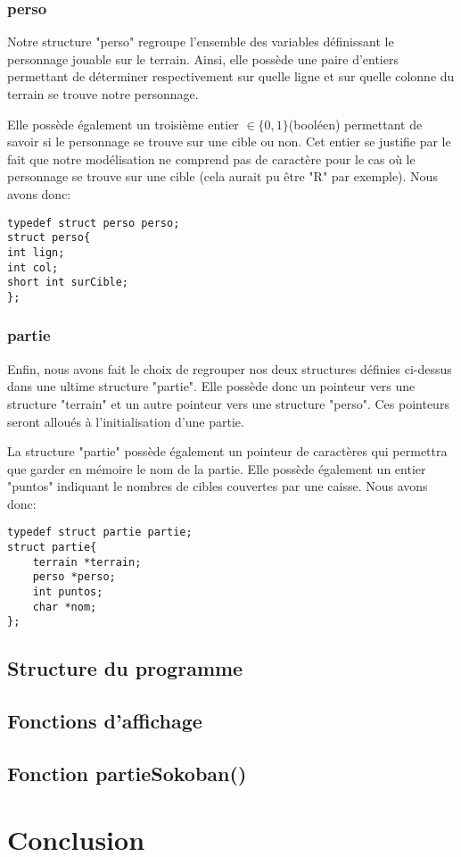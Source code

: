\documentclass[10pt,a4paper,french,titlepage]{article}
\begin{document}
\subsubsection{perso}
Notre structure "perso" regroupe l'ensemble des variables définissant le personnage jouable sur le terrain. Ainsi, elle possède une paire d'entiers permettant de déterminer respectivement sur quelle ligne et sur quelle colonne du terrain se trouve notre personnage. 

Elle possède également un troisième entier $\in \{0,1\}$(booléen) permettant de savoir si le personnage se trouve sur une cible ou non. Cet entier se justifie par le fait que notre modélisation ne comprend pas de caractère pour le cas où le personnage se trouve sur une cible (cela aurait pu être "R" par exemple). Nous avons donc:
\begin{lstlisting}
typedef struct perso perso;
struct perso{
int lign;
int col;
short int surCible;
};
\end{lstlisting}
\subsubsection{partie}
Enfin, nous avons fait le choix de regrouper nos deux structures définies ci-dessus dans une ultime structure "partie". Elle possède donc un pointeur vers une structure "terrain" et un autre pointeur vers une structure "perso". Ces pointeurs seront alloués à l'initialisation d'une partie.

La structure "partie" possède également un pointeur de caractères qui permettra que garder en mémoire le nom de la partie. Elle possède également un entier "puntos" indiquant le nombres de cibles couvertes par une caisse. Nous avons donc:
\begin{lstlisting}
typedef struct partie partie;
struct partie{
    terrain *terrain;
    perso *perso;
    int puntos;
    char *nom;
};
\end{lstlisting}
\subsection{Structure du programme}
\subsection{Fonctions d'affichage}
\subsection{Fonction partieSokoban()}
\section{Conclusion}
\end{document}

